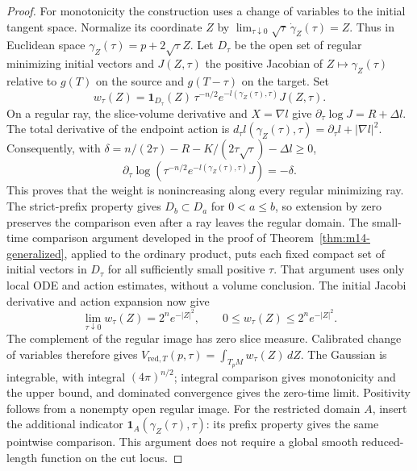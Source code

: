 \begin{proof}
For monotonicity the construction uses a change of variables to the initial
tangent space.  Normalize its coordinate $Z$ by
$\lim_{\tau\downarrow0}\sqrt\tau\,\dot\gamma_Z(\tau)=Z$.
Thus in Euclidean space $\gamma_Z(\tau)=p+2\sqrt\tau Z$.
Let $D_\tau$ be the open set of regular minimizing initial vectors and
$J(Z,\tau)$ the positive Jacobian of $Z\mapsto\gamma_Z(\tau)$ relative
to $g(T)$ on the source and $g(T-\tau)$ on the target.  Set
\[
 w_\tau(Z)=\boldsymbol 1_{D_\tau}(Z)\,
       \tau^{-n/2}e^{-l(\gamma_Z(\tau),\tau)}J(Z,\tau).
\]
On a regular ray, the slice-volume derivative and $X=\nabla l$ give
$\partial_\tau\log J=R+\Delta l$.  The total derivative of the endpoint
action is $d_\tau l(\gamma_Z(\tau),\tau)=\partial_\tau l+|\nabla l|^2$.
Consequently, with
$\delta=n/(2\tau)-R-K/(2\tau\sqrt\tau)-\Delta l\geq0$,
\[
 \partial_\tau\log(\tau^{-n/2}e^{-l(\gamma_Z(\tau),\tau)}J)
 =-\delta.
\]
This proves that the weight is nonincreasing along every regular minimizing
ray.  The strict-prefix
property gives $D_b\subset D_a$ for $0<a\leq b$, so extension by zero
preserves the comparison even after a ray leaves the regular domain.
The small-time comparison argument developed in the proof of
Theorem~\ref{thm:m14-generalized}, applied to the ordinary product, puts
each fixed compact set of initial vectors in $D_\tau$ for all sufficiently
small positive $\tau$.  That argument uses only local ODE and action
estimates, without a volume conclusion.  The initial Jacobi derivative and action expansion now give
\[
 \lim_{\tau\downarrow0}w_\tau(Z)=2^ne^{-|Z|^2},\qquad
 0\leq w_\tau(Z)\leq 2^ne^{-|Z|^2}.
\]
The complement of the regular image has zero slice measure.  Calibrated
change of variables therefore gives
$V_{\mathrm{red},T}(p,\tau)=\int_{T_pM}w_\tau(Z)\,dZ$.
The Gaussian is integrable, with integral $(4\pi)^{n/2}$; integral comparison
gives monotonicity and the upper bound, and dominated convergence gives the
zero-time limit.  Positivity follows from a nonempty open regular image.
For the restricted domain $A$, insert the additional indicator
$\boldsymbol1_A(\gamma_Z(\tau),\tau)$: its prefix property gives the same
pointwise comparison.  This argument does not require a global smooth
reduced-length function on the cut locus.


\end{proof}
